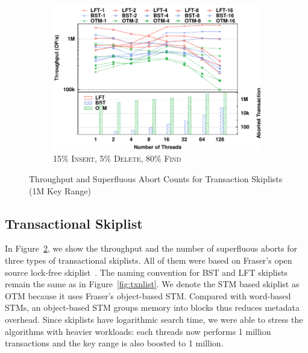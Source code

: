 \documentclass[10pt,conference,compsocconf]{IEEEtran}
\begin{document}
\begin{figure}[t]
\begin{subfigure}{0.325\textwidth}
        \centering
        \includegraphics[width=1\columnwidth]{./data/amdskip15ins10kfilled.pdf}
        \vspace{-0.17in}
        \caption{15\% \textsc{Insert}, 5\% \textsc{Delete}, 80\% \textsc{Find}}
        \label{fig:txnskip15}
    \end{subfigure}
    \caption{Throughput and Superfluous Abort Counts for Transaction Skiplists (1M Key Range)}
    \label{fig:txnskip}
    \vspace{-0.2in}
\end{figure}

\subsection{Transactional Skiplist}
\label{sec:txnskiplistexp}
In Figure~\ref{fig:txnskip}, we show the throughput and the number of superfluous aborts for three types of transactional skiplists.
All of them were based on Fraser's open source lock-free skiplist~\cite{fraser2004practical}. 
The naming convention for BST and LFT skiplists remain the same as in Figure~\ref{fig:txnlist}.
We denote the STM based skiplist as OTM because it uses Fraser's object-based STM.
Compared with word-based STMs, an object-based STM groups memory into blocks thus reduces metadata overhead.
Since skiplists have logarithmic search time, we were able to stress the algorithms with heavier workloads: each threads now performs 1 million transactions and the key range is also boosted to 1 million.
\end{document}
